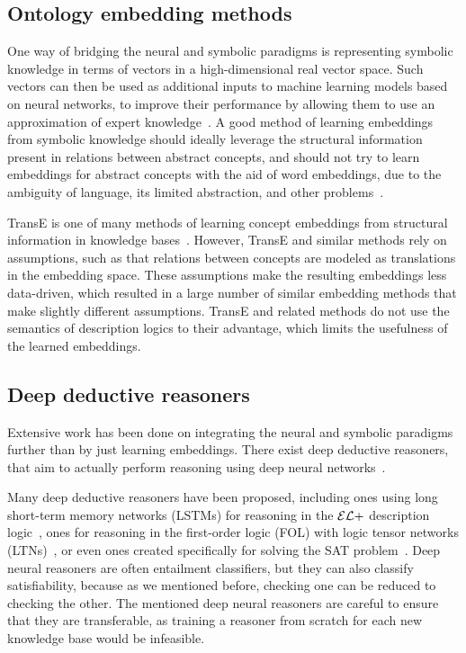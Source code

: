 \subsection{Ontology embedding methods}

One way of bridging the neural and symbolic paradigms is representing symbolic knowledge in terms of vectors in a high-dimensional real vector space.
Such vectors can then be used as additional inputs to machine learning models based on neural networks, to improve their performance by allowing them to use an approximation of expert knowledge~\cite{towell_knowledge-based_1994}.
A good method of learning embeddings from symbolic knowledge should ideally leverage the structural information present in relations between abstract concepts, and should not try to learn embeddings for abstract concepts with the aid of word embeddings, due to the ambiguity of language, its limited abstraction, and other problems~\cite{chen_contextual_2022}.

TransE is one of many methods of learning concept embeddings from structural information in knowledge bases~\cite{bordes_translating_2013,yang_embedding_2015}.
However, TransE and similar methods rely on assumptions, such as that relations between concepts are modeled as translations in the embedding space.
These assumptions make the resulting embeddings less data-driven, which resulted in a large number of similar embedding methods that make slightly different assumptions.
TransE and related methods do not use the semantics of description logics to their advantage, which limits the usefulness of the learned embeddings.

\subsection{Deep deductive reasoners}

Extensive work has been done on integrating the neural and symbolic paradigms further than by just learning embeddings.
There exist deep deductive reasoners, that aim to actually perform reasoning using deep neural networks~\cite{ebrahimi_towards_2021}.

Many deep deductive reasoners have been proposed, including ones using long short-term memory networks (LSTMs) for reasoning in the $\mathcal{EL}+$ description logic~\cite{eberhart_completion_2020}, ones for reasoning in the first-order logic (FOL) with logic tensor networks (LTNs)~\cite{badreddine_logic_2021,bianchi_capabilities_2019}, or even ones created specifically for solving the SAT problem~\cite{selsam_learning_2019}.
Deep neural reasoners are often entailment classifiers, but they can also classify satisfiability, because as we mentioned before, checking one can be reduced to checking the other.
The mentioned deep neural reasoners are careful to ensure that they are transferable, as training a reasoner from scratch for each new knowledge base would be infeasible.

